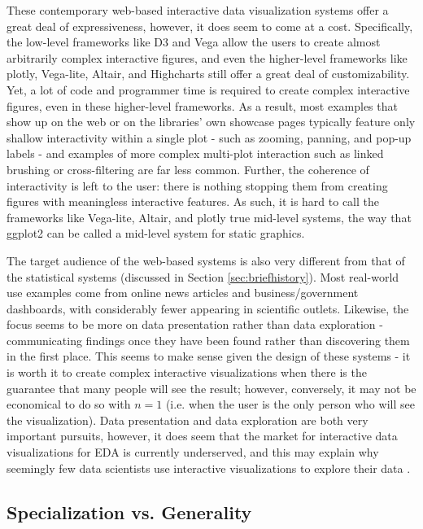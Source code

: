 \documentclass[12pt,a4paper]{article}
\begin{document}
These contemporary web-based interactive data visualization systems offer a great deal of expressiveness, however, it does seem to come at a cost. Specifically, the low-level frameworks like D3 and Vega allow the users to create almost arbitrarily complex interactive figures, and even the higher-level frameworks like plotly, Vega-lite, Altair, and Highcharts still offer a great deal of customizability. Yet, a lot of code and programmer time is required to create complex interactive figures, even in these higher-level frameworks. As a result, most examples that show up on the web or on the libraries' own showcase pages typically feature only shallow interactivity within a single plot - such as zooming, panning, and pop-up labels - and examples of more complex multi-plot interaction such as linked brushing or cross-filtering are far less common. Further, the coherence of interactivity is left to the user: there is nothing stopping them from creating figures with meaningless interactive features. As such, it is hard to call the frameworks like Vega-lite, Altair, and plotly true mid-level systems, the way that ggplot2 can be called a mid-level system for static graphics.  

The target audience of the web-based systems is also very different from that of the statistical systems (discussed in Section \ref{sec:briefhistory}). Most real-world use examples come from online news articles and business/government dashboards, with considerably fewer appearing in scientific outlets. Likewise, the focus seems to be more on data presentation rather than data exploration - communicating findings once they have been found rather than discovering them in the first place. This seems to make sense given the design of these systems - it is worth it to create complex interactive visualizations when there is the guarantee that many people will see the result; however, conversely, it may not be economical to do so with $n = 1$ (i.e. when the user is the only person who will see the visualization). Data presentation and data exploration are both very important pursuits, however, it does seem that the market for interactive data visualizations for EDA is currently underserved, and this may explain why seemingly few data scientists use interactive visualizations to explore their data \citep{batch2017}.  

\subsection{Specialization vs. Generality}
\end{document}
